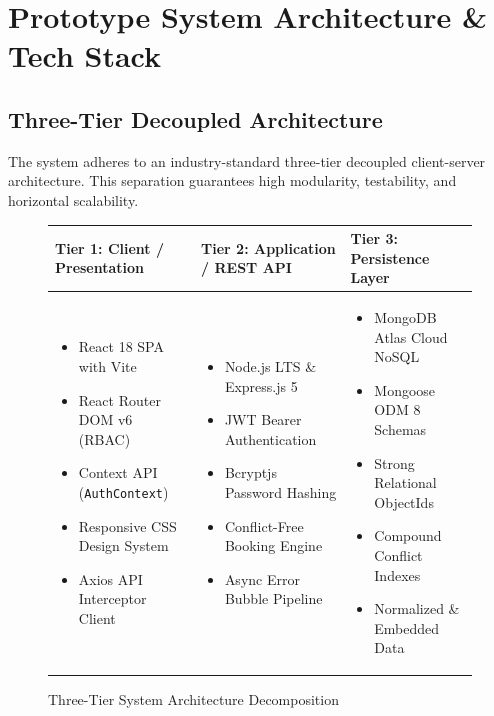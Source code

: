 \documentclass[11pt,a4paper]{article}
\begin{document}
\section{Prototype System Architecture \& Tech Stack}

\subsection{Three-Tier Decoupled Architecture}
The system adheres to an industry-standard three-tier decoupled client-server architecture. This separation guarantees high modularity, testability, and horizontal scalability.

\begin{figure}[H]
\centering
\small
\begin{tabularx}{\textwidth}{|X|X|X|}
\hline
\rowcolor{lightgray} \centering\textbf{Tier 1: Client / Presentation} & \centering\textbf{Tier 2: Application / REST API} & \centering\textbf{Tier 3: Persistence Layer} \tabularnewline
\hline
\begin{itemize}[leftmargin=1.2em, itemsep=0.1em, topsep=0.2em]
  \item React 18 SPA with Vite
  \item React Router DOM v6 (RBAC)
  \item Context API (\texttt{AuthContext})
  \item Responsive CSS Design System
  \item Axios API Interceptor Client
\end{itemize} & 
\begin{itemize}[leftmargin=1.2em, itemsep=0.1em, topsep=0.2em]
  \item Node.js LTS \& Express.js 5
  \item JWT Bearer Authentication
  \item Bcryptjs Password Hashing
  \item Conflict-Free Booking Engine
  \item Async Error Bubble Pipeline
\end{itemize} & 
\begin{itemize}[leftmargin=1.2em, itemsep=0.1em, topsep=0.2em]
  \item MongoDB Atlas Cloud NoSQL
  \item Mongoose ODM 8 Schemas
  \item Strong Relational ObjectIds
  \item Compound Conflict Indexes
  \item Normalized \& Embedded Data
\end{itemize} \tabularnewline
\hline
\end{tabularx}
\caption{Three-Tier System Architecture Decomposition}
\label{fig:tiers}
\end{figure}
\end{document}
